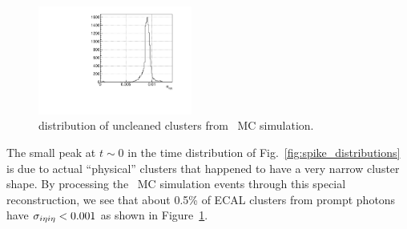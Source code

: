 \begin{figure}[htbp]
  \centering
  \includegraphics[width=0.45\textwidth]{Reconstruction/Figures/spikes/sieie_mc.pdf}
  \caption{
    \sieie distribution of uncleaned clusters from \gj\ MC simulation.
  }
  \label{fig:sieie_mc}
\end{figure}

The small peak at $t\sim 0$ in the time distribution of Fig.~\ref{fig:spike_distributions} is due to actual ``physical'' clusters that happened to have a very narrow cluster shape. 
By processing the \gj\ MC simulation events through this special reconstruction, we see that about 0.5\% of ECAL clusters from prompt photons have $\sigma_{i\eta i\eta} < 0.001$ as shown in Figure~\ref{fig:sieie_mc}.

